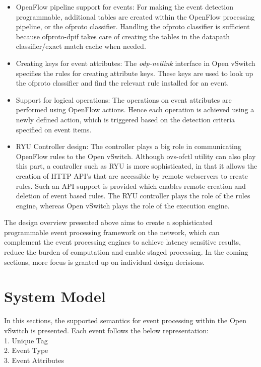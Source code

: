 \begin{itemize}
\begin{figure}[H]
\end{figure}
 \item OpenFlow pipeline support for events: For making the event detection programmable, additional tables are created within the OpenFlow processing pipeline, or the ofproto classifier. Handling the ofproto classifier is sufficient because ofproto-dpif takes care of creating the tables in the datapath classifier/exact match cache when needed.
 \item Creating keys for event attributes: The \textit{odp-netlink} interface in Open vSwitch specifies the rules for creating attribute keys. These keys are used to look up the ofproto classifier and find the relevant rule installed for an event. 
 \item Support for logical operations: The operations on event attributes are performed using OpenFlow actions. Hence each operation is achieved using a newly defined action, which is triggered based on the detection criteria specified on event items.
 \item RYU Controller design: The controller plays a big role in communicating OpenFlow rules to the Open vSwitch. Although ovs-ofctl utility can also play this part, a controller such as RYU is more sophisticated, in that it allows the creation of HTTP API's that are accessible by remote webservers to create rules. Such an API support is provided which enables remote creation and deletion of event based rules. The RYU controller plays the role of the rules engine, whereas Open vSwitch plays the role of the execution engine. 
\end{itemize}

The design overview presented above aims to create a sophisticated programmable event processing framework on the network, which can complement the event processing engines to achieve latency sensitive results, reduce the burden of computation and enable staged processing. In the coming sections, more focus is granted up on individual design decisions.


\section{System Model}
In this sections, the supported semantics for event processing within the Open vSwitch is presented. Each event follows the below representation:\\1. Unique Tag\\
2. Event Type\\3. Event Attributes


